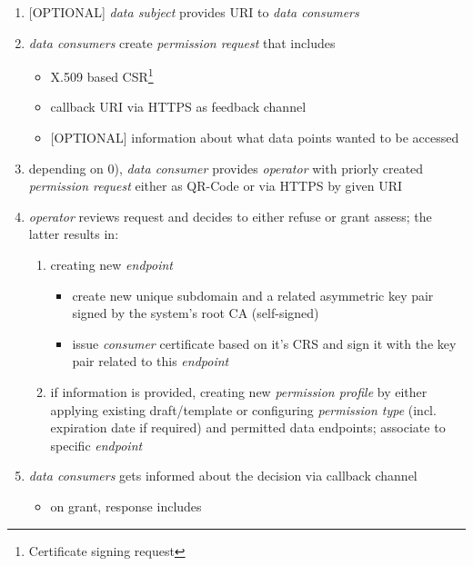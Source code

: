 \documentclass[12pt,english,a4paper,titlepage,cleardoublepage=empty,dottedtoc]{report}
\providecommand{\tightlist}{%
  \setlength{\itemsep}{0pt}\setlength{\parskip}{0pt}}
\begin{document}
\begin{enumerate}
\def\labelenumi{\arabic{enumi}.}
\setcounter{enumi}{-1}
\item
  {[}OPTIONAL{]} \emph{data subject} provides URI to \emph{data
  consumers}
\item
  \emph{data consumers} create \emph{permission request} that includes

  \begin{itemize}
  \tightlist
  \item
    X.509 based CSR\footnote{Certificate signing request}
  \item
    callback URI via HTTPS as feedback channel
  \item
    {[}OPTIONAL{]} information about what data points wanted to be
    accessed
  \end{itemize}
\item
  depending on 0), \emph{data consumer} provides \emph{operator} with
  priorly created \emph{permission request} either as QR-Code or via
  HTTPS by given URI
\item
  \emph{operator} reviews request and decides to either refuse or grant
  assess; the latter results in:

  \begin{enumerate}
  \def\labelenumii{\alph{enumii})}
  \tightlist
  \item
    creating new \emph{endpoint}

    \begin{itemize}
    \tightlist
    \item
      create new unique subdomain and a related asymmetric key pair
      signed by the system's root CA (self-signed)
    \item
      issue \emph{consumer} certificate based on it's CRS and sign it
      with the key pair related to this \emph{endpoint}
    \end{itemize}
  \item
    if information is provided, creating new \emph{permission profile}
    by either applying existing draft/template or configuring
    \emph{permission type} (incl. expiration date if required) and
    permitted data endpoints; associate to specific \emph{endpoint}
  \end{enumerate}
\item
  \emph{data consumers} gets informed about the decision via callback
  channel

  \begin{itemize}
  \tightlist
  \item
    on grant, response includes


\end{itemize}
\end{enumerate}
\end{document}
